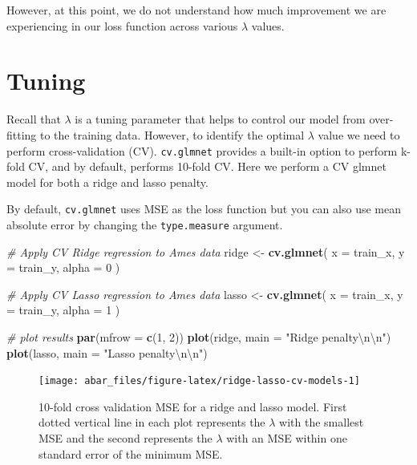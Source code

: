 \documentclass[]{book}
\newenvironment{Shaded}{\begin{snugshade}}{\end{snugshade}}
\newcommand{\CharTok}[1]{\textcolor[rgb]{0.31,0.60,0.02}{#1}}
\newcommand{\CommentTok}[1]{\textcolor[rgb]{0.56,0.35,0.01}{\textit{#1}}}
\newcommand{\DataTypeTok}[1]{\textcolor[rgb]{0.13,0.29,0.53}{#1}}
\newcommand{\DecValTok}[1]{\textcolor[rgb]{0.00,0.00,0.81}{#1}}
\newcommand{\KeywordTok}[1]{\textcolor[rgb]{0.13,0.29,0.53}{\textbf{#1}}}
\newcommand{\NormalTok}[1]{#1}
\newcommand{\StringTok}[1]{\textcolor[rgb]{0.31,0.60,0.02}{#1}}
\theoremstyle{definition}
\theoremstyle{definition}
\theoremstyle{definition}
\theoremstyle{remark}
\begin{document}
However, at this point, we do not understand how much improvement we are
experiencing in our loss function across various \(\lambda\) values.

\hypertarget{regression-glmnet-tune}{%
\section{Tuning}\label{regression-glmnet-tune}}

Recall that \(\lambda\) is a tuning parameter that helps to control our
model from over-fitting to the training data. However, to identify the
optimal \(\lambda\) value we need to perform cross-validation (CV).
\texttt{cv.glmnet} provides a built-in option to perform k-fold CV, and
by default, performs 10-fold CV. Here we perform a CV glmnet model for
both a ridge and lasso penalty.

\begin{rmdtip}
By default, \texttt{cv.glmnet} uses MSE as the loss function but you can
also use mean absolute error by changing the \texttt{type.measure}
argument.
\end{rmdtip}

\begin{Shaded}
\begin{Highlighting}[]
\CommentTok{# Apply CV Ridge regression to Ames data}
\NormalTok{ridge <-}\StringTok{ }\KeywordTok{cv.glmnet}\NormalTok{(}
  \DataTypeTok{x =}\NormalTok{ train_x,}
  \DataTypeTok{y =}\NormalTok{ train_y,}
  \DataTypeTok{alpha =} \DecValTok{0}
\NormalTok{)}

\CommentTok{# Apply CV Lasso regression to Ames data}
\NormalTok{lasso <-}\StringTok{ }\KeywordTok{cv.glmnet}\NormalTok{(}
  \DataTypeTok{x =}\NormalTok{ train_x,}
  \DataTypeTok{y =}\NormalTok{ train_y,}
  \DataTypeTok{alpha =} \DecValTok{1}
\NormalTok{)}

\CommentTok{# plot results}
\KeywordTok{par}\NormalTok{(}\DataTypeTok{mfrow =} \KeywordTok{c}\NormalTok{(}\DecValTok{1}\NormalTok{, }\DecValTok{2}\NormalTok{))}
\KeywordTok{plot}\NormalTok{(ridge, }\DataTypeTok{main =} \StringTok{"Ridge penalty}\CharTok{\textbackslash{}n\textbackslash{}n}\StringTok{"}\NormalTok{)}
\KeywordTok{plot}\NormalTok{(lasso, }\DataTypeTok{main =} \StringTok{"Lasso penalty}\CharTok{\textbackslash{}n\textbackslash{}n}\StringTok{"}\NormalTok{)}
\end{Highlighting}
\end{Shaded}

\begin{figure}

{\centering \texttt{[image: abar\_files/figure-latex/ridge-lasso-cv-models-1]} 

}

\caption{10-fold cross validation MSE for a ridge and lasso model. First dotted vertical line in each plot represents the $\lambda$ with the smallest MSE and the second represents the $\lambda$ with an MSE within one standard error of the minimum MSE.}\label{fig:ridge-lasso-cv-models}
\end{figure}
\end{document}
